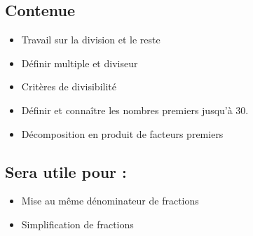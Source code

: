 \subsection{Contenue}

\begin{itemize}
    \item Travail sur la division et le reste
    \item Définir multiple et diviseur
    \item Critères de divisibilité
    \item Définir et connaître les nombres premiers jusqu'à 30.
    \item Décomposition en produit de facteurs premiers
\end{itemize}

\subsection{Sera utile pour :}
\begin{itemize}
    \item Mise au même dénominateur de fractions 
    \item Simplification de fractions
\end{itemize}